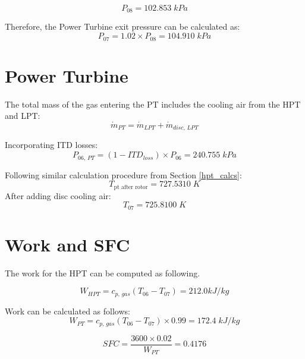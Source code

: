 $$P_{08} = 102.853\; kPa$$

Therefore, the Power Turbine exit pressure can be calculated as:
$$P_{07} = 1.02 \times P_{08} = 104.910\; kPa$$

\section{Power Turbine}
The total mass of the gas entering the PT includes the cooling air from the HPT and LPT:
$$\dot{m}_{PT} = \dot{m}_{LPT} + \dot{m}_{disc,\, LPT}$$

Incorporating ITD losses:
$$P_{06, \, PT} = (1 - ITD_{loss}) \times P_{06} = 240.755 \; kPa$$

Following similar calculation procedure from Section \ref{hpt_calcs}:
$$T_{\text{pt after rotor}} = 727.5310 \; K$$
After adding disc cooling air:
$$T_{07} = 725.8100 \; K$$


\section{Work and SFC}
The work for the HPT can be computed as following.

$$W_{HPT} = c_{p, \, gas} (T_{06} - T_{07}) = 212.0 kJ/kg$$


Work can be calculated as follows:
$$W_{PT} = c_{p, \, gas} (T_{06} - T_{07}) \times 0.99 = 172.4 \; kJ/kg$$

$$SFC = \frac{3600 \times 0.02}{W_{PT}} = 0.4176$$


\clearpage